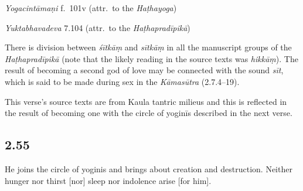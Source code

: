 \begin{ekdosis}
\begin{testimonia}[hp02_054]
\emph{Yogacintāmaṇi} f.~101v (attr.~to the \emph{Haṭhayoga})

\begin{versinnote}
\end{versinnote}

\emph{Yuktabhavadeva} 7.104 (attr.~to the \emph{Haṭhapradīpikā})

\begin{versinnote} 
\end{versinnote}


\end{testimonia}

\begin{philcomm}[hp02_054]


There is division between \emph{śītkāṃ} and \emph{sītkāṃ} in all the manuscript groups of the \emph{Haṭhapradīpikā} (note that the likely reading in the source texts was \emph{hikkāṃ}). The result of becoming a second god of love may be connected with the sound \emph{sīt}, which is said to be made during sex in the \emph{Kāmasūtra} (2.7.4–19). 

This verse’s source texts are from Kaula tantric milieus and this is reflected in the result of becoming one with the circle of yoginīs described in the next verse.

\end{philcomm}

\subsection*{2.55}
\begin{translation}[hp02_055]
He joins the circle of yoginis and brings about creation and destruction. Neither hunger nor thirst [nor] sleep nor indolence arise [for him].
\end{translation}


\end{ekdosis}
